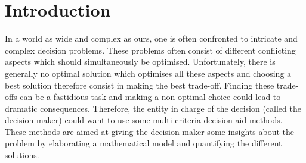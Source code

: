 \documentclass[conference,compsoc]{IEEEtran}
\begin{document}
\maketitle






%
\IEEEpeerreviewmaketitle



\section{Introduction}

In a world as wide and complex as ours, one is often confronted to intricate and complex decision problems. 
These problems often consist of different conflicting aspects which should simultaneously be optimised.
Unfortunately, there is generally no optimal solution which optimises all these aspects and choosing a best solution therefore consist in making the best trade-off. 
Finding these trade-offs can be a fastidious task and making a non optimal choice could lead to dramatic consequences.
Therefore, the entity in charge of the decision (called the decision maker) could want to use some multi-criteria decision aid methods. These methods are aimed at giving the decision maker some insights about the problem by elaborating a mathematical model and quantifying the different solutions.

% 
% 
 
\end{document}
